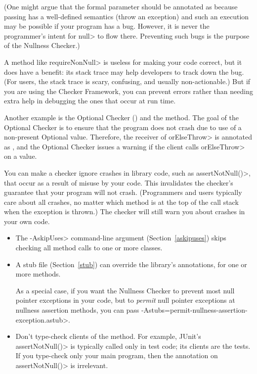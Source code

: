 (One might argue that the formal parameter should be annotated as
 because passing  has a
well-defined semantics (throw an exception) and such an execution may be
possible if your program has a bug.  However, it is never the programmer's
intent for \<null> to flow there.  Preventing such bugs is the purpose of
the Nullness Checker.)

A method like \<requireNonNull> is useless for making your code correct,
but it does have a benefit:  its stack trace may help developers to track
down the bug.  (For users, the stack trace is scary, confusing, and usually
non-actionable.)  But if you are using the Checker Framework, you can
prevent errors rather than needing extra help in debugging the ones that
occur at run time.


Another example is the Optional Checker ()
and the  method.
The goal of the Optional Checker is to ensure that the program does not
crash due to use of a non-present Optional value.  Therefore, the receiver
of
\<orElseThrow> is annotated as
,
and the Optional Checker issues a warning if the client calls
\<orElseThrow> on a  value.


You can make a checker ignore crashes in library code, such as
\<assertNotNull()>, that occur as a result of misuse by your code.
This invalidates the checker's guarantee that your program will not crash.
(Programmers and users typically care about all crashes, no matter which
method is at the top of the call stack when the exception is thrown.)
The checker will still warn you about crashes in your own code.

\begin{itemize}
\item
  The \<-AskipUses> command-line argument (Section~\ref{askipuses}) skips
  checking all method calls to one or more classes.
\item
  A stub file (Section~\ref{stub}) can override the library's annotations,
  for one or more methods.

  As a special case, if you want the Nullness Checker to prevent most null
  pointer exceptions in your code, but to \emph{permit} null pointer
  exceptions at nullness assertion methods, you can pass
  \<-Astubs=permit-nullness-assertion-exception.astub>.
\item
  Don't type-check clients of the method.  For example, JUnit's
  \<assertNotNull()> is typically called only in test code; its clients are
  the tests.  If you type-check only your main program, then the annotation
  on \<assertNotNull()> is irrelevant.
\end{itemize}


